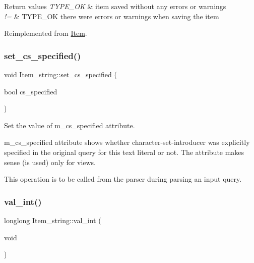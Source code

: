 \begin{DoxyRetVals}{Return values}
{\em T\+Y\+P\+E\+\_\+\+OK} & item saved without any errors or warnings \\
\hline
{\em !=} & T\+Y\+P\+E\+\_\+\+OK there were errors or warnings when saving the item \\
\hline
\end{DoxyRetVals}


Reimplemented from \mbox{\hyperlink{classItem_a463ded5f3c21ed2508dd8fddc6024722}{Item}}.

\mbox{\label{classItem__string_a13e88d867e7492fd75a5fae20ec244e5}} 
\subsubsection{\texorpdfstring{set\+\_\+cs\+\_\+specified()}{set\_cs\_specified()}}
{\footnotesize\ttfamily void Item\+\_\+string\+::set\+\_\+cs\+\_\+specified (\begin{DoxyParamCaption}\item[{bool}]{cs\+\_\+specified }\end{DoxyParamCaption})\hspace{0.3cm}{\ttfamily [inline]}}

Set the value of m\+\_\+cs\+\_\+specified attribute.

m\+\_\+cs\+\_\+specified attribute shows whether character-\/set-\/introducer was explicitly specified in the original query for this text literal or not. The attribute makes sense (is used) only for views.

This operation is to be called from the parser during parsing an input query. \mbox{\label{classItem__string_a4226f4dfd6a0c9eb1b97c33da0b3db78}} 
\subsubsection{\texorpdfstring{val\+\_\+int()}{val\_int()}}
{\footnotesize\ttfamily longlong Item\+\_\+string\+::val\+\_\+int (\begin{DoxyParamCaption}\item[{void}]{ }\end{DoxyParamCaption})\hspace{0.3cm}{\ttfamily [virtual]}}

